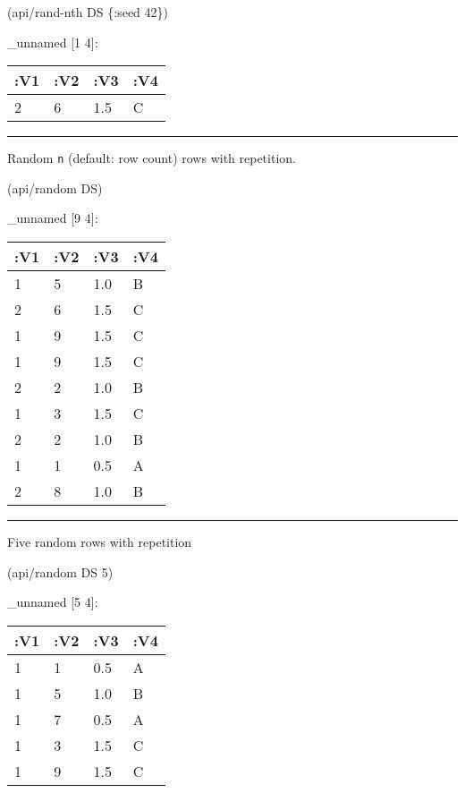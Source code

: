 \documentclass[]{article}
\newenvironment{Shaded}{\begin{snugshade}}{\end{snugshade}}
\newcommand{\AttributeTok}[1]{\textcolor[rgb]{0.77,0.63,0.00}{#1}}
\newcommand{\DecValTok}[1]{\textcolor[rgb]{0.00,0.00,0.81}{#1}}
\newcommand{\NormalTok}[1]{#1}
\begin{document}
\begin{Shaded}
\begin{Highlighting}[]
\NormalTok{(api/rand-nth DS \{}\AttributeTok{:seed} \DecValTok{42}\NormalTok{\})}
\end{Highlighting}
\end{Shaded}

\_unnamed {[}1 4{]}:

\begin{longtable}[]{@{}llll@{}}
\toprule
:V1 & :V2 & :V3 & :V4\tabularnewline
\midrule
\endhead
2 & 6 & 1.5 & C\tabularnewline
\bottomrule
\end{longtable}

\begin{center}\rule{0.5\linewidth}{0.5pt}\end{center}

Random \texttt{n} (default: row count) rows with repetition.

\begin{Shaded}
\begin{Highlighting}[]
\NormalTok{(api/random DS)}
\end{Highlighting}
\end{Shaded}

\_unnamed {[}9 4{]}:

\begin{longtable}[]{@{}llll@{}}
\toprule
:V1 & :V2 & :V3 & :V4\tabularnewline
\midrule
\endhead
1 & 5 & 1.0 & B\tabularnewline
2 & 6 & 1.5 & C\tabularnewline
1 & 9 & 1.5 & C\tabularnewline
1 & 9 & 1.5 & C\tabularnewline
2 & 2 & 1.0 & B\tabularnewline
1 & 3 & 1.5 & C\tabularnewline
2 & 2 & 1.0 & B\tabularnewline
1 & 1 & 0.5 & A\tabularnewline
2 & 8 & 1.0 & B\tabularnewline
\bottomrule
\end{longtable}

\begin{center}\rule{0.5\linewidth}{0.5pt}\end{center}

Five random rows with repetition

\begin{Shaded}
\begin{Highlighting}[]
\NormalTok{(api/random DS }\DecValTok{5}\NormalTok{)}
\end{Highlighting}
\end{Shaded}

\_unnamed {[}5 4{]}:

\begin{longtable}[]{@{}llll@{}}
\toprule
:V1 & :V2 & :V3 & :V4\tabularnewline
\midrule
\endhead
1 & 1 & 0.5 & A\tabularnewline
1 & 5 & 1.0 & B\tabularnewline
1 & 7 & 0.5 & A\tabularnewline
1 & 3 & 1.5 & C\tabularnewline
1 & 9 & 1.5 & C\tabularnewline
\bottomrule
\end{longtable}
\end{document}
